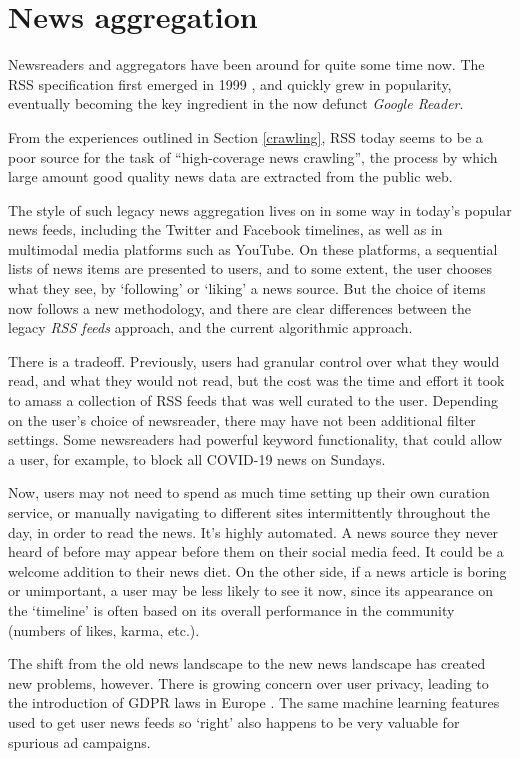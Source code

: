 \section{News aggregation}
Newsreaders and aggregators have been around for quite some time
now.  The RSS specification first emerged in 1999 \cite{rss1999},
and quickly grew in popularity, eventually becoming the key
ingredient in the now defunct {\it Google Reader}.

From the experiences outlined in Section \ref{crawling}, RSS today seems to
be a poor source for the task of ``high-coverage news
crawling'', the process by which large amount good quality
news data are extracted from the public web.

The style of such legacy news aggregation lives on in some way
in today's popular news feeds, including the Twitter and
Facebook timelines, as well as in multimodal media platforms such as
YouTube.  On these platforms, a sequential lists of news items are
presented to users, and to some extent, the user chooses what they see,
by `following' or `liking' a news source.  But the choice of items now
follows a new methodology, and there are clear differences between the
legacy {\it RSS feeds} approach, and the current algorithmic approach.

There is a tradeoff.  Previously, users had granular control over
what they would read, and what they would not read, but the cost
was the time and effort it took to amass a collection of RSS feeds
that was well curated to the user.  Depending on the user's choice
of newsreader, there may have not been additional filter settings.
Some newsreaders had powerful keyword functionality, that could allow
a user, for example, to block all COVID-19 news on Sundays.

Now, users may not need to
spend as much time setting up their own curation service, or
manually navigating to different sites intermittently throughout
the day, in order to read the news.  It's highly automated.  A news
source they never heard of before may appear before them on their
social media feed.  It could be a welcome addition to their news
diet.  On the other side, if a news article is boring or unimportant,
a user may be less likely to see it now, since its appearance on the
`timeline' is often based on its overall performance in the community
(numbers of likes, karma, etc.).

The shift from the old news landscape to the new news landscape has
created new problems, however.  There is growing concern over user
privacy, leading to the introduction of GDPR laws in Europe \cite{gdpr}.
The same machine learning features used to get user news feeds
so `right' also happens to be very valuable for spurious ad campaigns.

